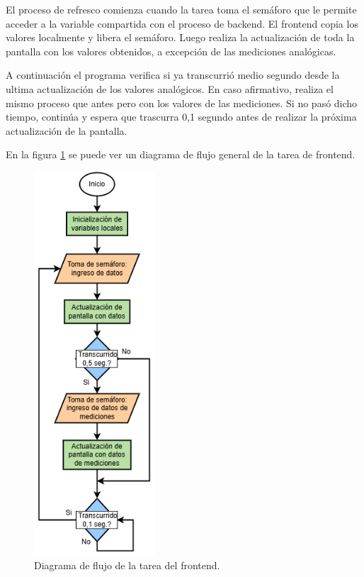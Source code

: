 El proceso de refresco comienza cuando la tarea toma el semáforo que le permite acceder a la variable compartida con el proceso de backend. El frontend copia los valores localmente y libera el semáforo. Luego realiza la actualización de toda la pantalla con los valores obtenidos, a excepción de las mediciones analógicas.

A continuación el programa verifica si ya transcurrió medio segundo desde la ultima actualización de los valores analógicos. En caso afirmativo, realiza el mismo proceso que antes pero con los valores de las mediciones. Si no pasó dicho tiempo, continúa y espera que trascurra 0,1 segundo antes de realizar la próxima actualización de la pantalla.

En la figura \ref{fig:taskDisp} se puede ver un diagrama de flujo general de la tarea de frontend.

\begin{figure}[H]
\centering
\includegraphics[width=0.4\textwidth]{./Figures/flowTaskDisp.png}
\caption{Diagrama de flujo de la tarea del frontend.}
\label{fig:taskDisp}
\end{figure}

